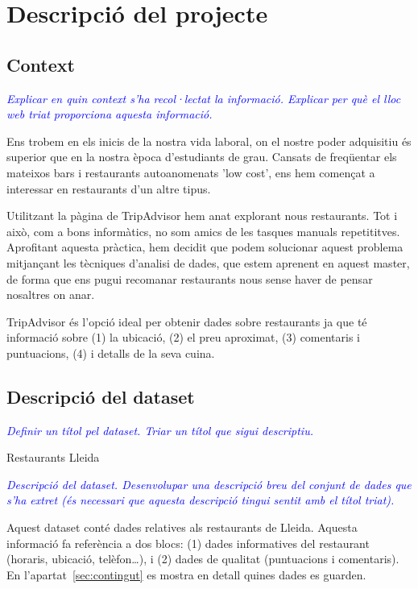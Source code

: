 \documentclass{article}
\title{\large \subject \\ \activity}
\author{Josep Alòs Pascual, Daniel Galan Vilella}
\date{\today}
\newcommand\enunciat[2][blue]{\textcolor{#1}{\emph{#2}}}
\begin{document}
\maketitle

\section{Descripció del projecte}
\subsection{Context}
\enunciat{Explicar en quin context s'ha recol·lectat la informació. Explicar per
què el lloc web triat proporciona aquesta informació.}

Ens trobem en els inicis de la nostra vida laboral, on el nostre poder
adquisitiu és superior que en la nostra època d'estudiants de grau. Cansats de
freqüentar els mateixos bars i restaurants autoanomenats 'low cost', ens hem
començat a interessar en restaurants d'un altre tipus.

Utilitzant la pàgina de TripAdvisor hem anat explorant nous restaurants. Tot i
això, com a bons informàtics, no som amics de les tasques manuals repetititves.
Aprofitant aquesta pràctica, hem decidit que podem solucionar aquest problema
mitjançant les tècniques d'analisi de dades, que estem aprenent en aquest
master, de forma que ens pugui recomanar restaurants nous sense haver de pensar
nosaltres on anar.

TripAdvisor és l'opció ideal per obtenir dades sobre restaurants ja que té
informació sobre (1) la ubicació, (2) el preu aproximat, (3) comentaris i
puntuacions, (4) i detalls de la seva cuina.


\subsection{Descripció del dataset}
\enunciat{Definir un títol pel dataset. Triar un títol que sigui descriptiu.}

Restaurants Lleida

\enunciat{Descripció del dataset. Desenvolupar una descripció breu del conjunt
de dades que s'ha extret (és necessari que aquesta descripció tingui sentit amb
el títol triat).}

Aquest dataset conté dades relatives als restaurants de Lleida. Aquesta
informació fa referència a dos blocs: (1) dades informatives del restaurant
(horaris, ubicació, telèfon\dots), i (2) dades de qualitat (puntuacions i
comentaris). En l'apartat~\ref{sec:contingut} es mostra en detall quines dades
es guarden.
\end{document}
